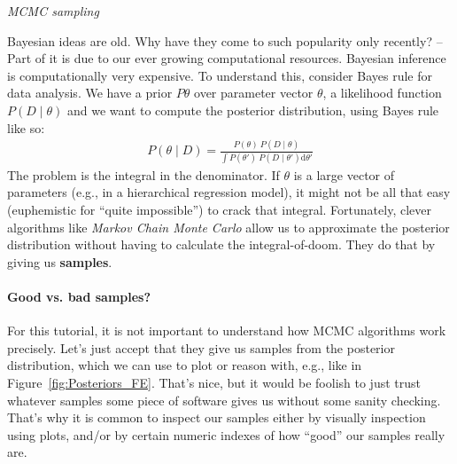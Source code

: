 \documentclass[nobib]{tufte-handout}
\begin{document}
\begin{InfoBox}[]
\centering
\colorbox{mygray}{\centering
  \begin{minipage}{1\textwidth}

    \emph{MCMC sampling}
    \medskip
 
    Bayesian ideas are old. Why have they come to such popularity only recently? -- 
    Part of it is due to our ever growing computational resources. Bayesian inference is computationally very expensive. To understand this,
    consider Bayes rule for data analysis. We have a prior $P{\theta}$ over parameter vector
    $\theta$, a likelihood function $P(D\mid\theta)$ and we want to compute the posterior
    distribution, using Bayes rule like so:
    \begin{eqnarray*}
      P(\theta \mid D) = \frac{P(\theta) \ P(D \mid \theta)}{ \int P(\theta') \ P(D \mid
      \theta') \textrm{d}\theta'}
    \end{eqnarray*}
    The problem is the integral in the denominator.
    If $\theta$ is a large vector of parameters
    (e.g., in a hierarchical regression model), it might not be all that easy (euphemistic for
    ``quite impossible'') to crack that integral. Fortunately, clever algorithms like \emph{Markov Chain
      Monte Carlo} allow us to approximate the posterior distribution without having to
    calculate the integral-of-doom. They do that by giving us \textbf{samples}.

\paragraph{Good vs. bad samples?}  
    For this tutorial, it is not important to understand how MCMC algorithms work precisely.
    Let's just accept that they give us samples from the posterior distribution, which we can
    use to plot or reason with, e.g., like in Figure~\ref{fig:Posteriors_FE}. That's nice, but
    it would be foolish to just trust whatever samples some piece of software gives us without
    some sanity checking. That's why it is common to inspect our samples either by visually inspection using plots, and/or by certain numeric indexes of  how ``good'' our samples really are.
    

\end{minipage}}
\end{InfoBox}
\end{document}
